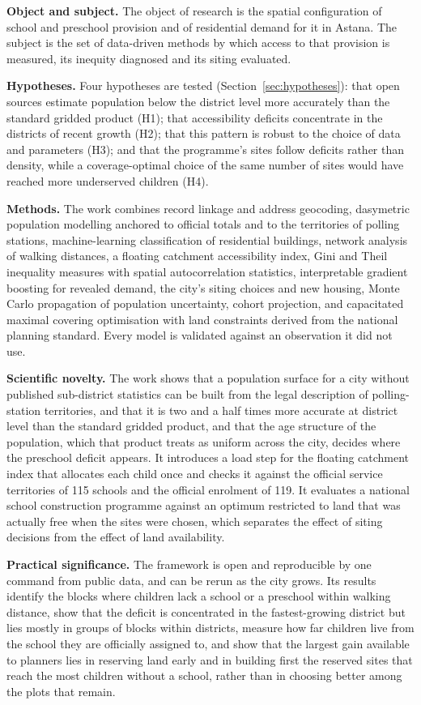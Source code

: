 \textbf{Object and subject.} The object of research is the spatial configuration of school and preschool provision and of residential demand for it in Astana. The subject is the set of data-driven methods by which access to that provision is measured, its inequity diagnosed and its siting evaluated.

\textbf{Hypotheses.} Four hypotheses are tested (Section~\ref{sec:hypotheses}): that open sources estimate population below the district level more accurately than the standard gridded product (H1); that accessibility deficits concentrate in the districts of recent growth (H2); that this pattern is robust to the choice of data and parameters (H3); and that the programme's sites follow deficits rather than density, while a coverage-optimal choice of the same number of sites would have reached more underserved children (H4).

\textbf{Methods.} The work combines record linkage and address geocoding, dasymetric population modelling anchored to official totals and to the territories of polling stations, machine-learning classification of residential buildings, network analysis of walking distances, a floating catchment accessibility index, Gini and Theil inequality measures with spatial autocorrelation statistics, interpretable gradient boosting for revealed demand, the city's siting choices and new housing, Monte Carlo propagation of population uncertainty, cohort projection, and capacitated maximal covering optimisation with land constraints derived from the national planning standard. Every model is validated against an observation it did not use.

\textbf{Scientific novelty.} The work shows that a population surface for a city without published sub-district statistics can be built from the legal description of polling-station territories, and that it is two and a half times more accurate at district level than the standard gridded product, and that the age structure of the population, which that product treats as uniform across the city, decides where the preschool deficit appears. It introduces a load step for the floating catchment index that allocates each child once and checks it against the official service territories of 115 schools and the official enrolment of 119. It evaluates a national school construction programme against an optimum restricted to land that was actually free when the sites were chosen, which separates the effect of siting decisions from the effect of land availability.

\textbf{Practical significance.} The framework is open and reproducible by one command from public data, and can be rerun as the city grows. Its results identify the blocks where children lack a school or a preschool within walking distance, show that the deficit is concentrated in the fastest-growing district but lies mostly in groups of blocks within districts, measure how far children live from the school they are officially assigned to, and show that the largest gain available to planners lies in reserving land early and in building first the reserved sites that reach the most children without a school, rather than in choosing better among the plots that remain.

